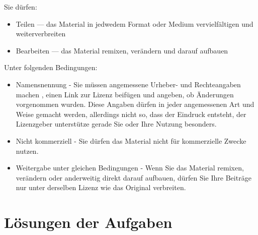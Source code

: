 \documentclass[a4paper,12pt, headsepline, ngerman]{scrartcl}
\begin{document}
	Sie dürfen:
	\begin{itemize}
		\item Teilen — das Material in jedwedem Format oder Medium vervielfältigen und weiterverbreiten
		\item Bearbeiten — das Material remixen, verändern und darauf aufbauen
	\end{itemize}
	Unter folgenden Bedingungen:
	\begin{itemize}
		\item Namensnennung - Sie müssen angemessene Urheber- und Rechteangaben machen , einen Link zur Lizenz beifügen und angeben, ob Änderungen vorgenommen wurden. Diese Angaben dürfen in jeder angemessenen Art und Weise gemacht werden, allerdings nicht so, dass der Eindruck entsteht, der Lizenzgeber unterstütze gerade Sie oder Ihre Nutzung besonders.
		\item Nicht kommerziell - Sie dürfen das Material nicht für kommerzielle Zwecke nutzen.
		\item Weitergabe unter gleichen Bedingungen - Wenn Sie das Material remixen, verändern oder anderweitig direkt darauf aufbauen, dürfen Sie Ihre Beiträge nur unter derselben Lizenz wie das Original verbreiten.
	\end{itemize}
	\newpage
	\tableofcontents
	\thispagestyle{empty}
	\newpage
	\def\pics{./pics}
	
	\newpage
	
	\newpage
	
	\newpage
	
	\newpage
	
	\newpage
	
	\newpage
	
	\newpage
	
	\newpage
	
	\newpage
	
	\newpage
	
	
	\newpage
	
	\newpage
	
    \newpage
    \section{Lösungen der Aufgaben}
    \shipoutAnswer
%    
\end{document}
